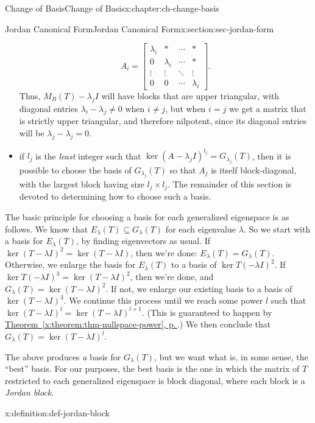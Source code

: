 \documentclass[oneside,10pt,]{book}
\newcommand{\xreffont}{\relax}
\numberwithin{equation}{section}
\newcommand{\bbm}{\begin{bmatrix}}
\newcommand{\ebm}{\end{bmatrix}}
\newcommand{\amp}{&}
\begin{document}
\begin{chapterptx}{Change of Basis}{}{Change of Basis}{}{}{x:chapter:ch-change-basis}
\begin{sectionptx}{Jordan Canonical Form}{}{Jordan Canonical Form}{}{}{x:section:sec-jordan-form}
\begin{itemize}[label=\textbullet]
\begin{equation*}
A_i = \bbm \lambda_i \amp \ast \amp \cdots \amp \ast\\
0 \amp \lambda_i \amp \cdots \amp \ast\\
\vdots \amp \vdots \amp \ddots\amp \vdots\\
0 \amp 0 \amp \cdots \amp \lambda_i\ebm\text{.}
\end{equation*}
Thus, \(M_B(T)-\lambda_j I\) will have blocks that are upper triangular, with diagonal entries \(\lambda_i-\lambda_j\neq 0\) when \(i\neq j\), but when \(i=j\) we get a matrix that is strictly upper triangular, and therefore nilpotent, since its diagonal entries will be \(\lambda_j-\lambda_j=0\).%
\item{}if \(l_j\) is the \emph{least} integer such that \(\ker (A-\lambda_j I)^{l_j}=G_{\lambda_j}(T)\), then it is possible to choose the basis of \(G_{\lambda_j}(T)\) so that \(A_j\) is itself block-diagonal, with the largest block having size \(l_j\times l_j\). The remainder of this section is devoted to determining how to choose such a basis.%
\end{itemize}
%
\par
The basic principle for choosing a basis for each generalized eigenspace is as follows. We know that \(E_{\lambda}(T)\subseteq G_\lambda(T)\) for each eigenvalue \(\lambda\). So we start with a basis for \(E_\lambda(T)\), by finding eigenvectors as usual. If \(\ker (T-\lambda I)^2 = \ker (T-\lambda I)\), then we're done: \(E_\lambda(T)=G_\lambda(T)\). Otherwise, we enlarge the basis for \(E_\lambda(T)\) to a basis of \(\ker T(-\lambda I)^2\). If \(\ker T(-\lambda I)^3=\ker (T-\lambda I)^2\), then we're done, and \(G_\lambda(T) = \ker (T-\lambda I)^2\). If not, we enlarge our existing basis to a basis of \(\ker (T-\lambda I)^3\). We continue this process until we reach some power \(l\) such that \(\ker (T-\lambda I)^l = \ker (T-\lambda I)^{l+1}\). (This is guaranteed to happen by \hyperref[x:theorem:thm-nullspace-power]{Theorem~{\xreffont\ref{x:theorem:thm-nullspace-power}}, p.\,\pageref{x:theorem:thm-nullspace-power}}.) We then conclude that \(G_\lambda(T) = \ker (T-\lambda I)^l\).%
\par
The above produces \emph{a} basis for \(G_\lambda(T)\), but we want what is, in some sense, the ``best'' basis. For our purposes, the best basis is the one in which the matrix of \(T\) restricted to each generalized eigenspace is block diagonal, where each block is a \emph{Jordan block}.%
\begin{definition}{}{x:definition:def-jordan-block}%

\end{definition}
\end{sectionptx}
\end{chapterptx}
\end{document}
